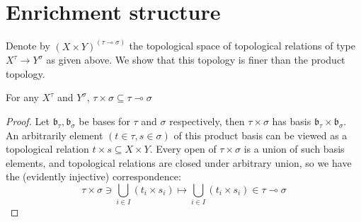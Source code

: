 \marginnote{
    \begin{remark}

    \end{remark}
}

\begin{defn}

\end{defn}



\section{Enrichment structure}



Denote by $(X \times Y)^{(\tau \multimap \sigma)}$ the topological space of topological relations of type $X^\tau \rightarrow Y^\sigma$ as given above. We show that this topology is finer than the product topology.

\begin{proposition}
For any $X^\tau$ and $Y^\sigma$, $\tau \times \sigma \subseteq \tau \multimap \sigma$
\begin{proof}
Let $\mathfrak{b}_\tau, \mathfrak{b}_\sigma$ be bases for $\tau$ and $\sigma$ respectively, then $\tau \times \sigma$ has basis $\mathfrak{b}_\tau \times \mathfrak{b}_\sigma$. An arbitrarily element $(t \in \tau, s \in \sigma)$ of this product basis can be viewed as a topological relation $t \times s \subseteq X \times Y$. Every open of $\tau \times \sigma$ is a union of such basis elements, and topological relations are closed under arbitrary union, so we have the (evidently injective) correspondence:
\[ \tau \times \sigma \ni \bigcup\limits_{i \in I}(t_i \times s_i) \mapsto \bigcup\limits_{i \in I}(t_i \times s_i) \in \tau \multimap \sigma \]
\end{proof}
\end{proposition}

